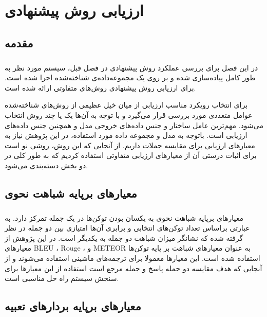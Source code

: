 
\chapter{ارزیابی روش پیشنهادی} \label{ch:eval}
\thispagestyle{empty}


\section{مقدمه}
\paragraph{}{
    در این فصل برای بررسی عملکرد روش پیشنهادی در فصل قبل، سیستم مورد نظر به طور کامل پیاده‌سازی
    شده و بر روی یک مجموعه‌داده‌ی شناخته‌شده اجرا شده است.
    برای ارزیابی روش پیشنهادی روش‌های متفاوتی ارائه شده است. 

    برای انتخاب رویکرد مناسب ارزیابی از میان خیل عظیمی از روش‌های شناخته‌شده
    عوامل متعددی مورد بررسی قرار می‌گیرد و با توجه به آن‌ها یک یا چند روش انتخاب می‌شود.
    مهم‌ترین عامل ساختار و جنس داده‌های خروجی مدل و همچنین جنس داده‌های ارزیابی است. باتوجه به مدل و مجموعه
    داده‌ مورد استفاده، در این پژوهش نیاز به معیارهای ارزیابی برای مقایسه جملات داریم. 
    از آنجایی که این روش، روشی نو است برای اثبات درستی آن از معیار‌های ارزیابی متفاوتی استفاده کردیم 
    که به طور کلی در دو بخش دسته‌بندی می‌شود. 
}

\section{
    معیارهای برپایه شباهت نحوی
}
\label{sec:wordbased}
\paragraph{}{
    معیارهای برپایه شباهت نحوی به یکسان بودن توکن‌ها در
    یک جمله تمرکز دارد. به عبارتی براساس تعداد توکن‌های 
    انتخابی و برابری آن‌ها امتیازی بین دو جمله در نظر گرفته
    شده که نشانگر میزان شباهت دو جمله به یکدیگر است. 
    در این پژوهش از معیارهای 
    BLEU \cite{papineni2002bleu}،
    Rouge \cite{lin2004rouge}،
    و
    METEOR \cite{banerjee2005meteor}
    به عنوان معیارهای شباهت بر پایه توکن‌ها استفاده‌ شده است.
    این معیارها معمولا برای ترجمه‌های ماشینی استفاده می‌شوند و از آنجایی
    که هدف مقایسه دو جمله پاسخ و جمله مرجع است 
    استفاده از این معیارها برای سنجش سیستم راه حل مناسبی است.

}

\section{
  معیارهای برپایه بردارهای تعبیه
} \label{sec:embeddingbased}
